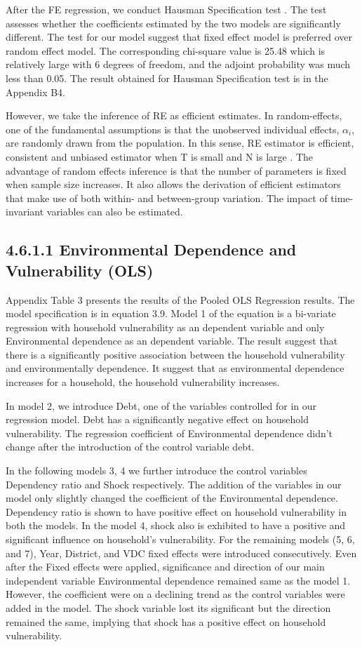 After the FE regression, we conduct Hausman Specification test \citep{hausman1978specification}. The test assesses whether the coefficients estimated by the two models are significantly different. The test for our model suggest that fixed effect model is preferred over random effect model. The corresponding chi-square value is 25.48 which is relatively large with 6 degrees of freedom, and the adjoint probability was much less than 0.05. The result obtained for Hausman Specification test is in the Appendix B4.

However, we take the inference of RE as efficient estimates. In random-effects, one of the fundamental assumptions is that the unobserved individual effects, $\mathit{\alpha_i}$, are randomly drawn from the population. In this sense, RE estimator is efficient, consistent and unbiased estimator when T is small and N is large \citep{hsiao2022analysis}. The advantage of random effects inference is that the number of
parameters is fixed when sample size increases. It also allows the derivation of efficient
estimators that make use of both within- and between-group variation. The impact of
time-invariant variables can also be estimated.
\subsection*{4.6.1.1 Environmental Dependence and Vulnerability (OLS)}
Appendix Table 3 presents the results of the Pooled OLS Regression results. The model specification is in equation 3.9. Model 1 of the equation is a bi-variate regression with household vulnerability as an dependent variable and only Environmental dependence as an dependent variable. The result suggest that there is a significantly positive association between the household vulnerability and environmentally dependence. It suggest that as environmental dependence increases for a household, the household vulnerability increases. 

In model 2, we introduce Debt, one of the variables controlled for in our regression model. Debt has a significantly negative effect on household vulnerability. The regression coefficient of Environmental dependence didn't change after the introduction of the control variable debt. 

In the following models 3, 4 we further introduce the control variables Dependency ratio and Shock respectively. The addition of the variables in our model only slightly changed the coefficient of the Environmental dependence. Dependency ratio is shown to have positive effect on household vulnerability in both the models. In the model 4, shock also is exhibited to have a positive and significant influence on household's vulnerability. For the remaining models (5, 6, and 7), Year, District, and VDC fixed effects were introduced consecutively. Even after the Fixed effects were applied, significance and direction of our main independent variable Environmental dependence remained same as the model 1. However, the coefficient were on a declining trend as the control variables were added in the model. The shock variable lost its significant but the direction remained the same, implying that shock has a positive effect on household vulnerability.

